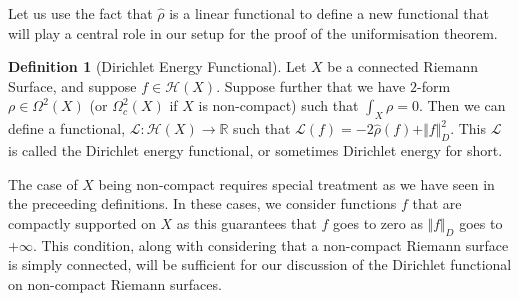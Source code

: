 \documentclass[11pt]{report}
\theoremstyle{definition}
\newtheorem{defn}[thm]{Definition}
\begin{document}
Let us use the fact that $\hat{\rho}$ is a linear functional to define a new functional that will play a central role in our setup for the proof of the uniformisation theorem.

\begin{defn}[Dirichlet Energy Functional]
  Let $X$ be a connected Riemann Surface, and suppose $f \in \mathcal{H}(X)$. Suppose further that we have $2$-form $\rho \in \Omega^2 (X)$ (or $\Omega^2_c (X)$ if $X$ is non-compact) such that $\int_X \rho = 0$. Then we can define a functional, $\mathcal{L}: 
  \mathcal{H}(X) \rightarrow \mathbb{R}$ such that $\mathcal{L}(f) = -2\hat{\rho}(f)+\Vert f\Vert ^2_D$. This $\mathcal{L}$ is called the Dirichlet energy functional, or sometimes Dirichlet energy for short.
\end{defn}

The case of $X$ being non-compact requires special treatment as we have seen in the preceeding definitions. In these cases, we consider functions $f$ that are compactly supported on $X$ as this guarantees that $f$ goes to zero as $\Vert f\Vert _D$ goes to $+\infty$. This condition, along with considering that a non-compact Riemann surface is simply connected, will be sufficient for our discussion of the Dirichlet functional on non-compact Riemann surfaces.
\end{document}

